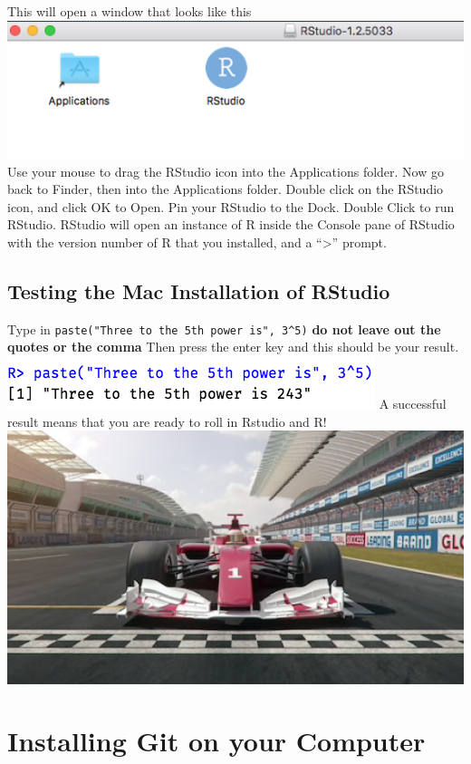 \documentclass[
]{book}
\begin{document}
This will open a window that looks like this
\includegraphics{images/rstudio_mac_apps.png}
Use your mouse to drag the RStudio icon into the Applications folder.
Now go back to Finder, then into the Applications folder.
Double click on the RStudio icon, and click OK to Open.
Pin your RStudio to the Dock.
Double Click to run RStudio.
RStudio will open an instance of R inside the Console pane of RStudio with the version number of R that you installed, and a ``\textgreater{}'' prompt.

\hypertarget{testing-the-mac-installation-of-rstudio}{%
\subsection{Testing the Mac Installation of RStudio}\label{testing-the-mac-installation-of-rstudio}}

Type in
\texttt{paste("Three\ to\ the\ 5th\ power\ is",\ 3\^{}5)}
\textbf{do not leave out the quotes or the comma}
Then press the enter key
and this should be your result.
\includegraphics{images/test_result35.png}
A successful result means that you are ready to roll in Rstudio and R!
\includegraphics{images/ready_to_R.png}

\hypertarget{installing-git-on-your-computer}{%
\section{Installing Git on your Computer}\label{installing-git-on-your-computer}}
\end{document}
